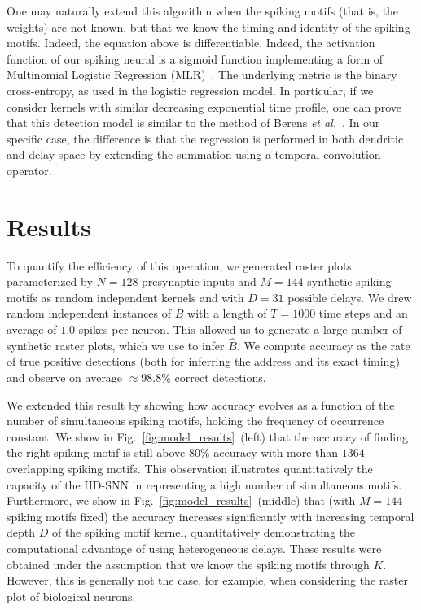\documentclass[runningheads]{llncs}
\newcommand{\kernel}{K} %
\newcommand{\fig}[1]{Fig.~\ref{fig:#1}}%
\begin{document}
One may naturally extend this algorithm when the spiking motifs (that is, the weights) are not known, but that we know the timing and identity of the spiking motifs. Indeed, the equation above is differentiable. Indeed, the activation function of our spiking neural is a sigmoid function implementing a form of  Multinomial Logistic Regression (MLR)~\cite{grimaldi_learning_2023}.  
The underlying metric is the binary cross-entropy, as used in the logistic regression model. In particular, if we consider kernels with similar decreasing exponential time profile, one can prove that this detection model is similar to the method of Berens {\it et al.}~\cite{berens_fast_2012}. In our specific case, the difference is that the regression is performed in both dendritic and delay space by extending the summation using a temporal convolution operator. 
% 
\section{Results}
%
To quantify the efficiency of this operation, we generated raster plots parameterized by $N=128$ presynaptic inputs and $M=144$ synthetic spiking motifs as random independent kernels and with $D=31$ possible delays. We drew random independent instances of $B$ with a length of $T=1000$ time steps and an average of $1.0$ spikes per neuron. This allowed us to generate a large number of synthetic raster plots, which we use to infer $\hat{B}$. We compute accuracy as the rate of true positive detections (both for inferring the address and its exact timing) and observe on average $\approx 98.8\%$ correct detections.

We extended this result by showing how accuracy evolves as a function of the number of simultaneous spiking motifs, holding the frequency of occurrence constant. We show in \fig{model_results}~(left) that the accuracy of finding the right spiking motif is still above $80\%$ accuracy with more than $1364$ overlapping spiking motifs. This observation illustrates quantitatively the capacity  of the HD-SNN in representing a high number of simultaneous motifs. Furthermore, we show in \fig{model_results}~(middle) that (with $M=144$ spiking motifs fixed) the accuracy increases significantly with increasing temporal depth $D$ of the spiking motif kernel, quantitatively demonstrating the computational advantage of using heterogeneous delays. These results were obtained under the assumption that we know the spiking motifs through $\kernel$. However, this is generally not the case, for example, when considering the raster plot of biological neurons.
\end{document}
